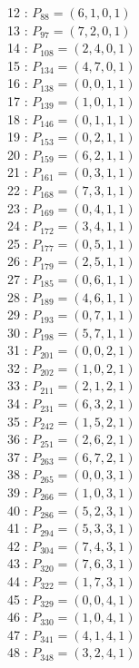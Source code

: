 \documentclass{article}
\begin{document}
{\begin{multicols}{3}
12 : $P_{88}=( 6, 1, 0, 1 )$\\
13 : $P_{97}=( 7, 2, 0, 1 )$\\
14 : $P_{108}=( 2, 4, 0, 1 )$\\
15 : $P_{134}=( 4, 7, 0, 1 )$\\
16 : $P_{138}=( 0, 0, 1, 1 )$\\
17 : $P_{139}=( 1, 0, 1, 1 )$\\
18 : $P_{146}=( 0, 1, 1, 1 )$\\
19 : $P_{153}=( 0, 2, 1, 1 )$\\
20 : $P_{159}=( 6, 2, 1, 1 )$\\
21 : $P_{161}=( 0, 3, 1, 1 )$\\
22 : $P_{168}=( 7, 3, 1, 1 )$\\
23 : $P_{169}=( 0, 4, 1, 1 )$\\
24 : $P_{172}=( 3, 4, 1, 1 )$\\
25 : $P_{177}=( 0, 5, 1, 1 )$\\
26 : $P_{179}=( 2, 5, 1, 1 )$\\
27 : $P_{185}=( 0, 6, 1, 1 )$\\
28 : $P_{189}=( 4, 6, 1, 1 )$\\
29 : $P_{193}=( 0, 7, 1, 1 )$\\
30 : $P_{198}=( 5, 7, 1, 1 )$\\
31 : $P_{201}=( 0, 0, 2, 1 )$\\
32 : $P_{202}=( 1, 0, 2, 1 )$\\
33 : $P_{211}=( 2, 1, 2, 1 )$\\
34 : $P_{231}=( 6, 3, 2, 1 )$\\
35 : $P_{242}=( 1, 5, 2, 1 )$\\
36 : $P_{251}=( 2, 6, 2, 1 )$\\
37 : $P_{263}=( 6, 7, 2, 1 )$\\
38 : $P_{265}=( 0, 0, 3, 1 )$\\
39 : $P_{266}=( 1, 0, 3, 1 )$\\
40 : $P_{286}=( 5, 2, 3, 1 )$\\
41 : $P_{294}=( 5, 3, 3, 1 )$\\
42 : $P_{304}=( 7, 4, 3, 1 )$\\
43 : $P_{320}=( 7, 6, 3, 1 )$\\
44 : $P_{322}=( 1, 7, 3, 1 )$\\
45 : $P_{329}=( 0, 0, 4, 1 )$\\
46 : $P_{330}=( 1, 0, 4, 1 )$\\
47 : $P_{341}=( 4, 1, 4, 1 )$\\
48 : $P_{348}=( 3, 2, 4, 1 )$\\

\end{multicols}}
\end{document}
